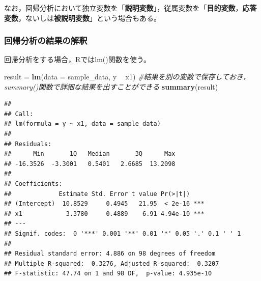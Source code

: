 \documentclass[]{article}
\newenvironment{Shaded}{\begin{snugshade}}{\end{snugshade}}
\newcommand{\KeywordTok}[1]{\textcolor[rgb]{0.13,0.29,0.53}{\textbf{#1}}}
\newcommand{\DataTypeTok}[1]{\textcolor[rgb]{0.13,0.29,0.53}{#1}}
\newcommand{\StringTok}[1]{\textcolor[rgb]{0.31,0.60,0.02}{#1}}
\newcommand{\CommentTok}[1]{\textcolor[rgb]{0.56,0.35,0.01}{\textit{#1}}}
\newcommand{\OperatorTok}[1]{\textcolor[rgb]{0.81,0.36,0.00}{\textbf{#1}}}
\newcommand{\NormalTok}[1]{#1}
\begin{document}
なお，回帰分析において独立変数を「\textbf{説明変数}」，従属変数を「\textbf{目的変数}，\textbf{応答変数}，ないしは\textbf{被説明変数}」という場合もある。

\subsubsection{回帰分析の結果の解釈}

回帰分析をする場合，Rではlm()関数を使う。

\begin{Shaded}
\begin{Highlighting}[]
\NormalTok{result =}\StringTok{ }\KeywordTok{lm}\NormalTok{(}\DataTypeTok{data =}\NormalTok{ sample_data, y }\OperatorTok{~}\StringTok{ }\NormalTok{x1) }\CommentTok{#結果を別の変数で保存しておき，summary()関数で詳細な結果を出すことができる}
\KeywordTok{summary}\NormalTok{(result)}
\end{Highlighting}
\end{Shaded}

\begin{verbatim}
## 
## Call:
## lm(formula = y ~ x1, data = sample_data)
## 
## Residuals:
##      Min       1Q   Median       3Q      Max 
## -16.3526  -3.3001   0.5401   2.6685  13.2098 
## 
## Coefficients:
##             Estimate Std. Error t value Pr(>|t|)    
## (Intercept)  10.8529     0.4945   21.95  < 2e-16 ***
## x1            3.3780     0.4889    6.91 4.94e-10 ***
## ---
## Signif. codes:  0 '***' 0.001 '**' 0.01 '*' 0.05 '.' 0.1 ' ' 1
## 
## Residual standard error: 4.886 on 98 degrees of freedom
## Multiple R-squared:  0.3276, Adjusted R-squared:  0.3207 
## F-statistic: 47.74 on 1 and 98 DF,  p-value: 4.935e-10
\end{verbatim}
\end{document}

